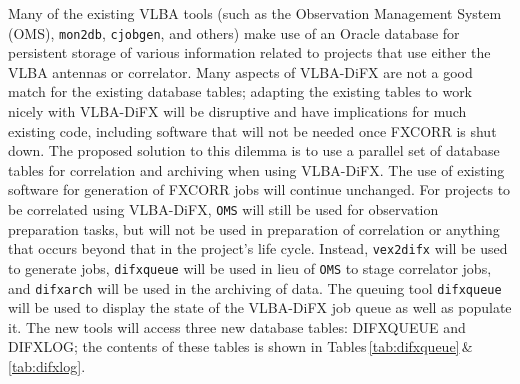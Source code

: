 Many of the existing VLBA tools (such as the Observation Management System (OMS), {\tt mon2db}, {\tt cjobgen}, and others) make use of an Oracle database for persistent storage of various information related to projects that use either the VLBA antennas or correlator.
Many aspects of VLBA-DiFX are not a good match for the existing database tables; adapting the existing tables to work nicely with VLBA-DiFX will be disruptive and have implications for much existing code, including software that will not be needed once FXCORR is shut down.
The proposed solution to this dilemma is to use a parallel set of database tables for correlation and archiving when using VLBA-DiFX.
The use of existing software for generation of FXCORR jobs will continue unchanged.
For projects to be correlated using VLBA-DiFX, {\tt OMS} will still be used for observation preparation tasks, but will not be used in preparation of correlation or anything that occurs beyond that in the project's life cycle.  Instead, {\tt vex2difx} will be used to generate jobs, {\tt difxqueue} will be used in lieu of {\tt OMS} to stage correlator jobs, and {\tt difxarch} will be used in the archiving of data.
The queuing tool {\tt difxqueue} will be used to display the state of the VLBA-DiFX job queue as well as populate it.
The new tools will access three new database tables: DIFXQUEUE and DIFXLOG; the contents of these tables is shown in Tables\,\ref{tab:difxqueue}\,\&\,\ref{tab:difxlog}.

